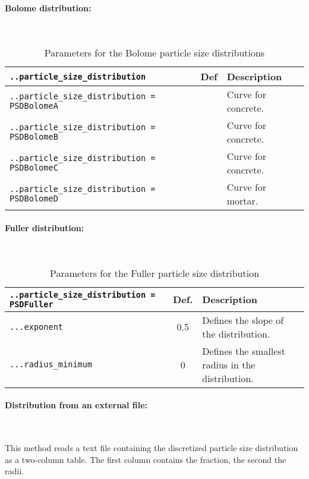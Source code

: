 \documentclass[10pt]{article}
\newcommand{\whiteline}{\textcolor{white}{.\\}}
\begin{document}
\paragraph{Bolome distribution:} \whiteline

\begin{table}[h!]
\begin{tabularx}{\textwidth}{lcX}
\verb+..particle_size_distribution+ & Def & Description \\
\hline
\verb+..particle_size_distribution = PSDBolomeA+ & & Curve for concrete.\\
\verb+..particle_size_distribution = PSDBolomeB+ & & Curve for concrete.\\
\verb+..particle_size_distribution = PSDBolomeC+ & & Curve for concrete.\\
\verb+..particle_size_distribution = PSDBolomeD+ & & Curve for mortar.\\
\hline
\end{tabularx}
\caption{Parameters for the Bolome particle size distributions}
\end{table}

\paragraph{Fuller distribution:} \whiteline

\begin{table}[h!]
\begin{tabularx}{\textwidth}{lcX}
\verb+..particle_size_distribution = PSDFuller+ & Def. & Description\\
\hline
\verb+...exponent+ & 0.5 & Defines the slope of the distribution. \\
\verb+...radius_minimum+ & 0 & Defines the smallest radius in the distribution. \\
\hline
\end{tabularx}
\caption{Parameters for the Fuller particle size distribution}
\end{table}

\paragraph{Distribution from an external file:} \whiteline

This method reads a text file containing the discretized particle size distribution as a two-column table. 
The first column contains the fraction, the second the radii.
\end{document}
